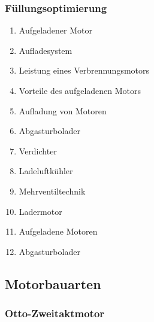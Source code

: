 \subsubsection{Füllungsoptimierung}\label{fuellungsoptimierung}

\begin{enumerate}
\item
  Aufgeladener Motor\\
\item
  Aufladesystem\\
\item
  Leistung eines Verbrennungsmotors\\
\item
  Vorteile des aufgeladenen Motors\\
\item
  Aufladung von Motoren\\
\item
  Abgasturbolader\\
\item
  Verdichter\\
\item
  Ladeluftkühler\\
\item
  Mehrventiltechnik\\
\item
  Ladermotor\\
\item
  Aufgeladene Motoren\\
\item
  Abgasturbolader
\end{enumerate}

\subsection{Motorbauarten}\label{motorbauarten}

\subsubsection{Otto-Zweitaktmotor}\label{otto-zweitaktmotor}

